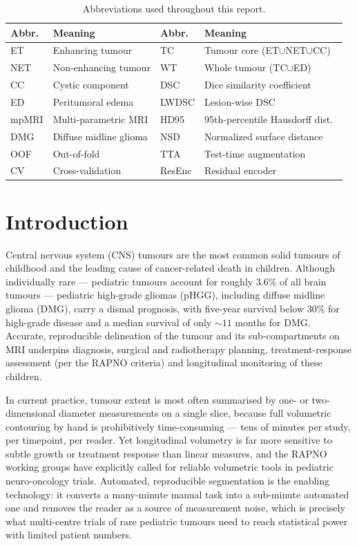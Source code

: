 \documentclass[11pt,a4paper]{article}
\begin{document}
\begin{table}[h]
\centering
\caption{Abbreviations used throughout this report.}
\label{tab:abbr}
\small
\begin{tabular}{ll@{\hskip 1.5cm}ll}
\toprule
Abbr. & Meaning & Abbr. & Meaning \\
\midrule
ET  & Enhancing tumour            & TC   & Tumour core (ET$\cup$NET$\cup$CC) \\
NET & Non-enhancing tumour        & WT   & Whole tumour (TC$\cup$ED) \\
CC  & Cystic component            & DSC  & Dice similarity coefficient \\
ED  & Peritumoral edema           & LWDSC& Lesion-wise DSC \\
mpMRI & Multi-parametric MRI      & HD95 & 95th-percentile Hausdorff dist.\ \\
DMG & Diffuse midline glioma      & NSD  & Normalized surface distance \\
OOF & Out-of-fold                 & TTA  & Test-time augmentation \\
CV  & Cross-validation            & ResEnc & Residual encoder \\
\bottomrule
\end{tabular}
\end{table}

\section{Introduction}
Central nervous system (CNS) tumours are the most common solid tumours of childhood
and the leading cause of cancer-related death in children. Although individually
rare --- pediatric tumours account for roughly $3.6\%$ of all brain tumours ---
pediatric high-grade gliomas (pHGG), including diffuse midline glioma (DMG), carry a
dismal prognosis, with five-year survival below $30\%$ for high-grade disease and a
median survival of only $\sim\!11$ months for DMG. Accurate, reproducible
delineation of the tumour and its sub-compartments on MRI underpins diagnosis,
surgical and radiotherapy planning, treatment-response assessment (per the RAPNO
criteria) and longitudinal monitoring of these children.

In current practice, tumour extent is most often summarised by one- or
two-dimensional diameter measurements on a single slice, because full volumetric
contouring by hand is prohibitively time-consuming --- tens of minutes per study, per
timepoint, per reader. Yet longitudinal volumetry is far more sensitive to subtle
growth or treatment response than linear measures, and the RAPNO working groups have
explicitly called for reliable volumetric tools in pediatric neuro-oncology trials.
Automated, reproducible segmentation is the enabling technology: it converts a
many-minute manual task into a sub-minute automated one and removes the reader as a
source of measurement noise, which is precisely what multi-centre trials of rare
pediatric tumours need to reach statistical power with limited patient numbers.
\end{document}
